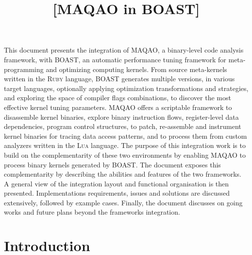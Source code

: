 \documentclass[11pt, a4paper, twoside]{montblanc2}
\def\lua{\textsc{Lua}\xspace}
\def\ruby{\textsc{Ruby}\xspace}
\begin{document}
\devnum{[5.11]}
\title{[MAQAO in BOAST]}
\version{[0.1]}
\deadline{[2017/01/16]}
\level{[PU]}
\nature{[O]}
\contributors{} %
\reviewers{} %

\maketitle

\begin{changelog}
\end{changelog}

\frontmatter

\begin{executive}

  This document presents the integration of MAQAO, a binary-level code analysis 
  framework, with BOAST, an automatic performance tuning framework for 
  meta-programming and optimizing computing kernels. From source meta-kernels 
  written in the \ruby language, BOAST generates multiple versions, in various 
  target languages, optionally applying optimization transformations and 
  strategies, and exploring the space of compiler flags combinations, to 
  discover the most effective kernel tuning parameters. MAQAO offers a 
  scriptable framework to disassemble kernel binaries, explore binary 
  instruction flows, register-level data dependencies, program control 
  structures, to patch, re-assemble and instrument kernel binaries for tracing data 
  access patterns, and to process them from custom analyzers written in the \lua 
  language. The purpose of this integration work is to build on the 
  complementarity of these two environments by enabling MAQAO to process binary 
  kernels generated by BOAST. The document exposes this complementarity by 
  describing the abilities and features of the two frameworks. A general view of 
  the integration layout and functional organisation is then presented. 
  Implementations requirements, issues and solutions are discussed extensively, 
  followed by example cases. Finally, the document discusses on going works and future 
  plans beyond the frameworks integration.

\end{executive}

\section{Introduction}\label{sec:intro}
\end{document}
